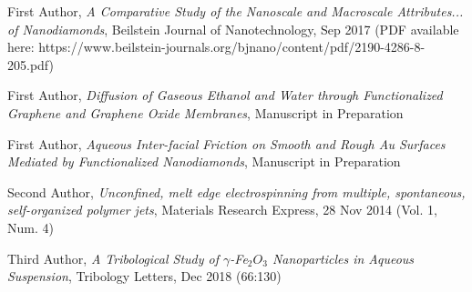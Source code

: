 \documentclass[letterpaper,final]{memoir}
\newcommand{\SmallSep}{\vspace{0.4em}}
\begin{document}
\begin{compactitem}[\color{Blue}$\circ$]
	 
    \item First Author, \textit{A Comparative Study of the Nanoscale and Macroscale Attributes... of Nanodiamonds}, Beilstein Journal of Nanotechnology, Sep 2017 (PDF available here: https://www.beilstein-journals.org/bjnano/content/pdf/2190-4286-8-205.pdf)
    \SmallSep

    \item First Author, \textit{Diffusion of Gaseous Ethanol and Water through Functionalized Graphene and Graphene Oxide Membranes}, Manuscript in Preparation
    \SmallSep

    \item First Author, \textit{Aqueous Inter-facial Friction on Smooth and Rough Au Surfaces Mediated by Functionalized Nanodiamonds}, Manuscript in Preparation
    \SmallSep
    
    \item Second Author, \textit{Unconfined, melt edge electrospinning from multiple, spontaneous, self-organized polymer jets}, Materials Research Express, 28 Nov 2014 (Vol. 1, Num. 4)
    \SmallSep

    \item Third Author, \textit{A Tribological Study of $\gamma$-Fe$_{2}O_{3}$ Nanoparticles in Aqueous Suspension}, Tribology Letters, Dec 2018 (66:130)
	
\end{compactitem}
\end{document}
